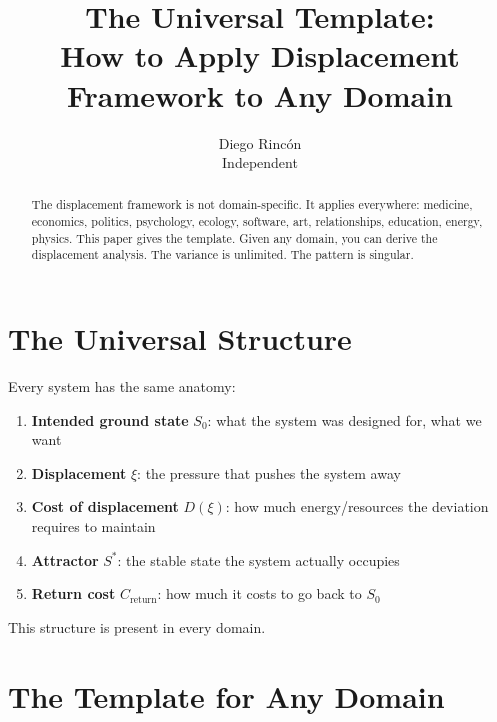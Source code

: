 \documentclass[12pt]{article}
\title{The Universal Template:\\
How to Apply Displacement Framework to Any Domain}
\author{Diego Rincón\\
\small Independent}
\date{}
\theoremstyle{definition}
\theoremstyle{remark}
\begin{document}
\maketitle

\begin{abstract}
The displacement framework is not domain-specific. It applies everywhere: medicine, economics, politics, psychology, ecology, software, art, relationships, education, energy, physics. This paper gives the template. Given any domain, you can derive the displacement analysis. The variance is unlimited. The pattern is singular.
\end{abstract}

\section{The Universal Structure}

Every system has the same anatomy:
\begin{enumerate}
\item \textbf{Intended ground state} $S_0$: what the system was designed for, what we want
\item \textbf{Displacement} $\xi$: the pressure that pushes the system away
\item \textbf{Cost of displacement} $D(\xi)$: how much energy/resources the deviation requires to maintain
\item \textbf{Attractor} $S^*$: the stable state the system actually occupies
\item \textbf{Return cost} $C_{\text{return}}$: how much it costs to go back to $S_0$
\end{enumerate}

This structure is present in every domain.

\section{The Template for Any Domain}
\end{document}
